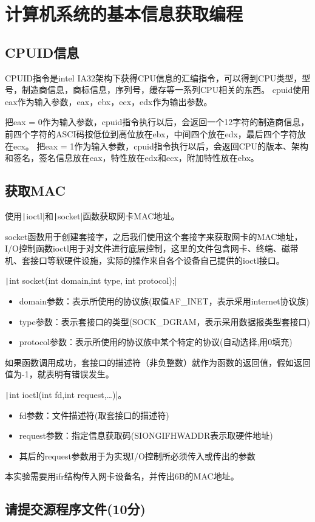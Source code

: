 \section{计算机系统的基本信息获取编程}
\subsection{CPUID信息}
CPUID指令是intel IA32架构下获得CPU信息的汇编指令，可以得到CPU类型，型号，制造商信息，商标信息，序列号，缓存等一系列CPU相关的东西。
cpuid使用eax作为输入参数，eax，ebx，ecx，edx作为输出参数。

把eax = 0作为输入参数，cpuid指令执行以后，会返回一个12字符的制造商信息，前四个字符的ASCI码按低位到高位放在ebx，中间四个放在edx，最后四个字符放在ecx。
把eax = 1作为输入参数，cpuid指令执行以后，会返回CPU的版本、架构和签名，签名信息放在eax，特性放在edx和ecx，附加特性放在ebx。

\subsection{获取MAC}
使用\texttt|ioctl|和\texttt|socket|函数获取网卡MAC地址。

socket函数用于创建套接字，之后我们使用这个套接字来获取网卡的MAC地址，I/O控制函数ioctl用于对文件进行底层控制，这里的文件包含网卡、终端、磁带机、套接口等软硬件设施，实际的操作来自各个设备自己提供的ioctl接口。

\texttt|int socket(int domain,int type, int protocol);|
\begin{itemize}
	\item domain参数：表示所使用的协议族(取值AF\_INET，表示采用internet协议族)
	\item type参数：表示套接口的类型(SOCK\_DGRAM，表示采用数据报类型套接口)
	\item protocol参数：表示所使用的协议族中某个特定的协议(自动选择,用0填充)
\end{itemize}

如果函数调用成功，套接口的描述符（非负整数）就作为函数的返回值，假如返回值为-1，就表明有错误发生。

\texttt|int ioctl(int fd,int request,…)|。
\begin{itemize}
	\item fd参数：文件描述符(取套接口的描述符)
	\item request参数：指定信息获取码(SIONGIFHWADDR表示取硬件地址)
	\item 其后的request参数用于为实现I/O控制所必须传入或传出的参数
\end{itemize}

本实验需要用ifr结构传入网卡设备名，并传出6B的MAC地址。

\subsection{请提交源程序文件(10分)} 
\inputminted{c}{src/sysinfo.c}